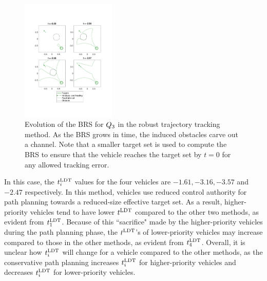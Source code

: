 \begin{figure}[H]
  \centering
  \includegraphics[width=0.40\textwidth]{"fig/rtt_rs3"}
  \caption{Evolution of the BRS for $Q_3$ in the robust trajectory tracking method. As the BRS grows in time, the induced obstacles carve out a channel. Note that a smaller target set is used to compute the BRS to ensure that the vehicle reaches the target set by $t=0$ for any allowed tracking error.}
  \label{fig:rtt_rs3}
  \vspace{-1em}
\end{figure}
\vspace{-0.2em}

In this case, the $t^\text{LDT}_i$ values for the four vehicles are $-1.61, -3.16, -3.57$ and $-2.47$ respectively. In this method, vehicles use reduced control authority for path planning towards a reduced-size effective target set. As a result, higher-priority vehicles tend to have lower $t^\text{LDT}$ compared to the other two methods, as evident from $t^\text{LDT}_1$. Because of this ``sacrifice" made by the higher-priority vehicles during the path planning phase, the $t^\text{LDT}$'s of lower-priority vehicles may increase compared to those in the other methods, as evident from $t^\text{LDT}_4$. Overall, it is unclear how $t^\text{LDT}_i$ will change for a vehicle compared to the other methods, as the conservative path planning increases $t^\text{LDT}_i$ for higher-priority vehicles and decreases $t^\text{LDT}_i$ for lower-priority vehicles.